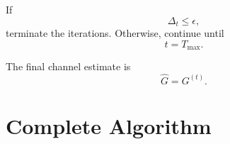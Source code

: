\documentclass[12pt,a4paper]{article}
\begin{document}
If
\begin{equation}
\boxed{
\Delta_t\leq\epsilon,
}
\tag{352}
\end{equation}
terminate the iterations. Otherwise, continue until
\begin{equation}
t=T_{\max}.
\tag{353}
\end{equation}

The final channel estimate is
\begin{equation}
\boxed{
\widehat G
=
G^{(t)}
}.
\tag{354}
\end{equation}

\section{Complete Algorithm}
\end{document}
